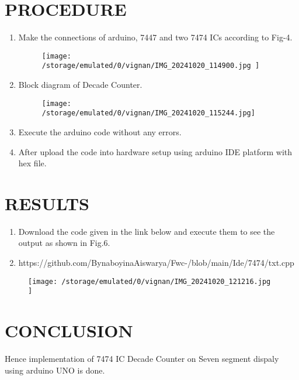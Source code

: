 \documentclass[conference]{IEEEtran}
\begin{document}
\section{PROCEDURE}


\begin{enumerate}

\item Make the connections of arduino, 7447 and two 7474 ICs according to Fig-4.
	\begin{figure}[h] 
	\centering 
	\texttt{[image:    /storage/emulated/0/vignan/IMG\_20241020\_114900.jpg     ]}
	\caption{\label{fig-4:Gates}}    
\end{figure}

\item Block diagram of Decade Counter.

\begin{figure}[h]                           
\centering                                 
\texttt{[image:    /storage/emulated/0/vignan/IMG\_20241020\_115244.jpg]}                                           
\caption{\label{fig-5:Gates}}               
\end{figure}


	
\item Execute the arduino code without any errors.
\item After upload the code into hardware setup using arduino IDE platform with hex file.
 \end{enumerate}

\section{RESULTS}
 \begin{enumerate}
	 \item Download the code given in the link below and execute them to see the output as shown in Fig.6. 
	 \item https://github.com/BynaboyinaAiswarya/Fwc-/blob/main/Ide/7474/txt.cpp
 \end{enumerate}
		 \begin{figure}[h] 
	\centering 
	\texttt{[image:  /storage/emulated/0/vignan/IMG\_20241020\_121216.jpg    ]}
	\caption{\label{fig-6:Gates}}    
\end{figure}
\section{CONCLUSION}
Hence implementation of 7474 IC Decade Counter on Seven segment dispaly using arduino UNO is done.
\end{document}

